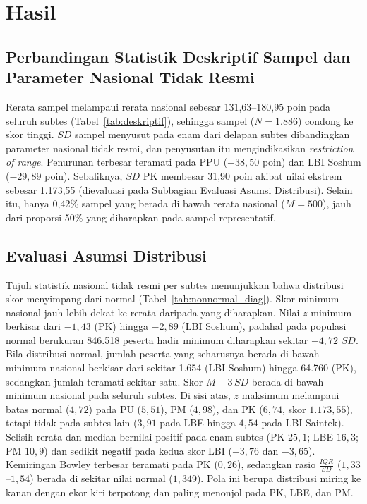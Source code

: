 \section{Hasil}

\subsection{Perbandingan Statistik Deskriptif Sampel dan Parameter Nasional Tidak Resmi}



Rerata sampel melampaui rerata nasional sebesar 131,63--180,95 poin pada seluruh subtes (Tabel~\ref{tab:deskriptif}), sehingga sampel ($N=1.886$) condong ke skor tinggi. $SD$ sampel menyusut pada enam dari delapan subtes dibandingkan parameter nasional tidak resmi, dan penyusutan itu mengindikasikan \textit{restriction of range}. Penurunan terbesar teramati pada PPU ($-38,50$ poin) dan LBI Soshum ($-29,89$ poin). Sebaliknya, $SD$ PK membesar 31,90 poin akibat nilai ekstrem sebesar 1.173,55 (dievaluasi pada Subbagian Evaluasi Asumsi Distribusi). Selain itu, hanya 0,42\% sampel yang berada di bawah rerata nasional ($M=500$), jauh dari proporsi 50\% yang diharapkan pada sampel representatif.

\subsection{Evaluasi Asumsi Distribusi}
Tujuh statistik nasional tidak resmi per subtes menunjukkan bahwa distribusi skor menyimpang dari normal (Tabel~\ref{tab:nonnormal_diag}). Skor minimum nasional jauh lebih dekat ke rerata daripada yang diharapkan. Nilai $z$ minimum berkisar dari $-1,43$ (PK) hingga $-2,89$ (LBI Soshum), padahal pada populasi normal berukuran 846.518 peserta hadir minimum diharapkan sekitar $-4,72$ $SD$. Bila distribusi normal, jumlah peserta yang seharusnya berada di bawah minimum nasional berkisar dari sekitar 1.654 (LBI Soshum) hingga 64.760 (PK), sedangkan jumlah teramati sekitar satu. Skor $M - 3\,SD$ berada di bawah minimum nasional pada seluruh subtes. Di sisi atas, $z$ maksimum melampaui batas normal ($4,72$) pada PU ($5,51$), PM ($4,98$), dan PK ($6,74$, skor $1.173,55$), tetapi tidak pada subtes lain ($3,91$ pada LBE hingga $4,54$ pada LBI Saintek). Selisih rerata dan median bernilai positif pada enam subtes (PK $25,1$; LBE $16,3$; PM $10,9$) dan sedikit negatif pada kedua skor LBI ($-3,76$ dan $-3,65$). Kemiringan Bowley terbesar teramati pada PK ($0,26$), sedangkan rasio $\frac{IQR}{SD}$ ($1,33$--$1,54$) berada di sekitar nilai normal ($1,349$). Pola ini berupa distribusi miring ke kanan dengan ekor kiri terpotong dan paling menonjol pada PK, LBE, dan PM.

